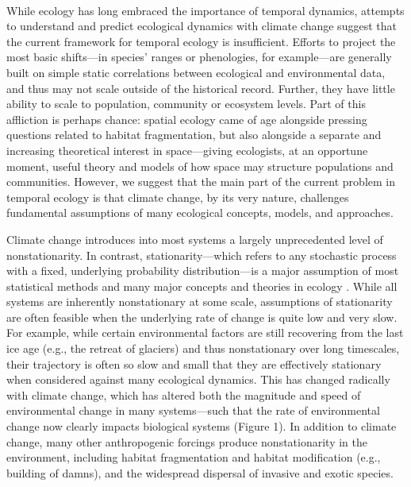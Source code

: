 \documentclass[11pt,a4paper,oneside]{article}
\begin{document}
\\

\noindent While ecology has long embraced the importance of temporal dynamics, attempts to understand and predict ecological dynamics with climate change suggest that the current framework for temporal ecology is insufficient. Efforts to project the most basic shifts---in species' ranges or phenologies, for example---are generally built on simple static correlations between ecological and environmental data, and thus may not scale outside of the historical record. Further, they have little ability to scale to population, community or ecosystem levels. Part of this affliction is perhaps chance: spatial ecology came of age alongside pressing questions related to habitat fragmentation, but also alongside a separate and increasing theoretical interest in space---giving ecologists, at an opportune moment, useful theory and models of how space may structure populations and communities. However, we suggest that the main part of the current problem in temporal ecology is that climate change, by its very nature, challenges fundamental assumptions of many ecological concepts, models, and approaches. 

Climate change introduces into most systems a largely unprecedented level of nonstationarity. In contrast, stationarity---which refers to any stochastic process with a fixed, underlying probability distribution---is a major assumption of most statistical methods and many major concepts and theories in ecology \citep{julio2012}. While all systems are inherently nonstationary at some scale, assumptions of stationarity are often feasible when the underlying rate of change is quite low and very slow. For example, while certain environmental factors are still recovering from the last ice age (e.g., the retreat of glaciers) and thus nonstationary over long timescales, their trajectory is often so slow and small that they are effectively stationary when considered against many ecological dynamics. This has changed radically with climate change, which has altered both the magnitude and speed of environmental change in many systems---such that the rate of environmental change now clearly impacts biological systems (Figure 1). In addition to climate change, many other anthropogenic forcings produce nonstationarity in the environment, including habitat fragmentation and habitat modification (e.g., building of damns), and the widespread dispersal of invasive and exotic species.
\end{document}
